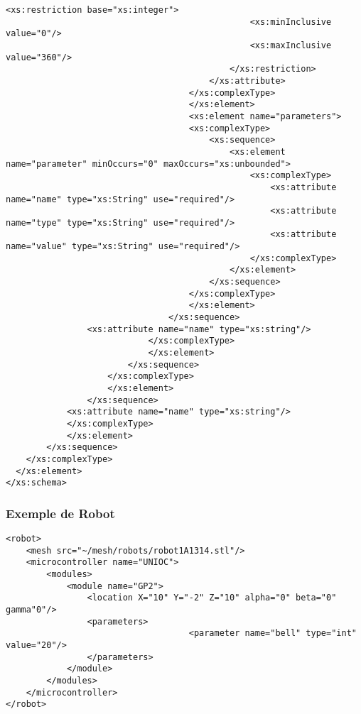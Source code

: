 \begin{changemargin}{-1cm}{-1cm}
\begin{lstlisting}[caption=Description du Robot, label=descbot]
                                            <xs:restriction base="xs:integer">
                                                <xs:minInclusive value="0"/>
                                                <xs:maxInclusive value="360"/>
                                            </xs:restriction>
                                        </xs:attribute>
                                    </xs:complexType>
                                    </xs:element>
                                    <xs:element name="parameters">
                                    <xs:complexType>
                                        <xs:sequence>
                                            <xs:element name="parameter" minOccurs="0" maxOccurs="xs:unbounded">
                                                <xs:complexType>
                                                    <xs:attribute name="name" type="xs:String" use="required"/>
                                                    <xs:attribute name="type" type="xs:String" use="required"/>
                                                    <xs:attribute name="value" type="xs:String" use="required"/>
                                                </xs:complexType>
                                            </xs:element>
                                        </xs:sequence>
                                    </xs:complexType>
                                    </xs:element>
                                </xs:sequence>
				<xs:attribute name="name" type="xs:string"/>
                            </xs:complexType>
                            </xs:element>
                        </xs:sequence>
                    </xs:complexType>
                    </xs:element>
                </xs:sequence>
	        <xs:attribute name="name" type="xs:string"/>
            </xs:complexType>
            </xs:element>
        </xs:sequence>
    </xs:complexType>
  </xs:element>
</xs:schema>
  \end{lstlisting}
\end{changemargin}

\subsubsection{Exemple de Robot}
\begin{lstlisting}[caption=Exemple de Robot, label=exrobot]
<robot>
	<mesh src="~/mesh/robots/robot1A1314.stl"/>
	<microcontroller name="UNIOC">
		<modules>
			<module name="GP2">
				<location X="10" Y="-2" Z="10" alpha="0" beta="0" gamma"0"/>
				<parameters>
                                	<parameter name="bell" type="int" value="20"/>
				</parameters>
			</module>
		</modules>
	</microcontroller>
</robot>
\end{lstlisting}
  
